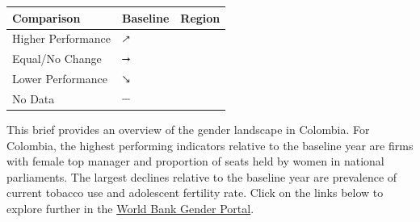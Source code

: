 \documentclass[
]{article}
\author{}
\date{\vspace{-2.5em}}
\begin{document}
\begin{table}\begingroup\fontsize{8}{10}\selectfont

\begin{tabular}[t]{lll}

\textbf{Comparison} & \textbf{Baseline} & \textbf{Region}\\
\midrule
Higher Performance & \includegraphics[width=0.1in, height=0.1in]{upicon.png} & \cellcolor[HTML]{46F884}{}\\
Equal/No Change & \includegraphics[width=0.1in, height=0.1in]{righticon.png} & \cellcolor[HTML]{E1DD37}{}\\
Lower Performance & \includegraphics[width=0.1in, height=0.1in]{downicon.png} & \cellcolor[HTML]{F05B12}{}\\
No Data & \includegraphics[width=0.1in, height=0.1in]{naicon.png} & \cellcolor{lightgray}{}\\

\end{tabular}
\endgroup{}\end{table}
\begin{minipage}[t][1.8cm][t]{12cm}
\fontsize{9}{8}\selectfont\raggedright
This brief provides an overview of the gender landscape in Colombia. For Colombia, the highest performing indicators relative to the baseline year are firms with female top manager and proportion of seats held by women in national parliaments. The largest declines relative to the baseline year are prevalence of current tobacco use and adolescent fertility rate. Click on the links below to explore further in the \href{http://graphicacy-wb-gender-portal.s3-website-us-east-1.amazonaws.com/}{World Bank Gender Portal}.
\end{minipage}
\vspace{4pt}

\renewcommand{\arraystretch}{1.15}

\begingroup\fontsize{8}{10}\selectfont
\end{document}
